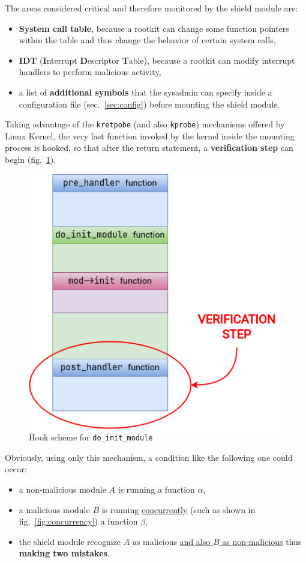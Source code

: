 \documentclass{article}
\begin{document}
	The areas considered critical and therefore monitored by the shield module are:
	\begin{itemize}
		\item \textbf{System call table}, because a rootkit can change some function pointers within the table and thus
		change the behavior of certain system calls,
		\item \textbf{IDT} (\textbf{I}nterrupt \textbf{D}escriptor \textbf{T}able), because a rootkit can modify
		interrupt handlers to perform malicious activity,
		\item a list of \textbf{additional symbols} that the sysadmin can specify inside a configuration file
		(sec.~\ref{sec:config}) before mounting the shield module.
	\end{itemize}

	Taking advantage of the \texttt{kretpobe} (and also \texttt{kprobe}) mechanisms offered by Linux
	Kernel, the very last function invoked by the kernel inside the mounting process is hooked, so
	that after the return statement, a \textbf{verification step} can begin (fig.~\ref{fig:monitoring}).

	\begin{figure}[!htbp]
		\centering
		\includegraphics[scale=0.4]{monitoring}
		\caption{Hook scheme for \texttt{do\_init\_module}}
		\label{fig:monitoring}
	\end{figure}

	Obviously, using only this mechanism, a condition like the following one could occur:
	\begin{itemize}
		\item a non-malicious module $A$ is running a function $\alpha$,
		\item a malicious module $B$ is running \ul{concurrently} (such as shown in fig.~\ref{fig:concurrency}) a
		function $\beta$,
		\item the shield module recognize $A$ as malicious \ul{and also $B$ as non-malicious} thus \textbf{making two
		mistakes}.
	\end{itemize}
\end{document}
